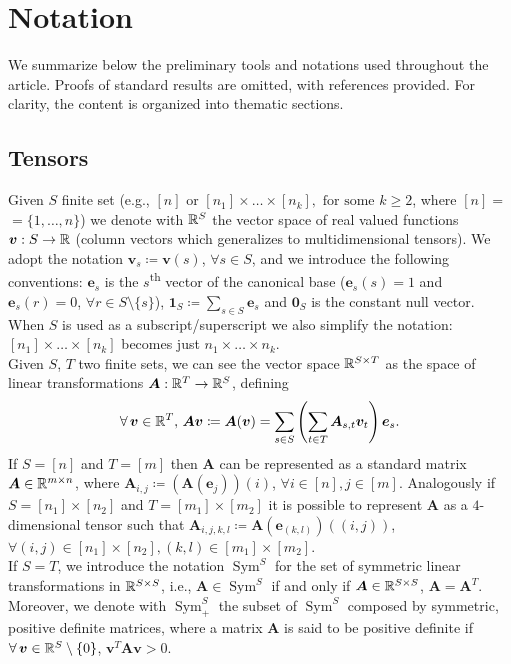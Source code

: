 \section{Notation} \label{sec:notation}

We summarize below the preliminary tools and notations used throughout the article. Proofs of standard results are omitted, with references provided. For clarity, the content is organized into thematic sections.

\subsection{Tensors} \label{subsec:tensors}

Given $S$ finite set (e.g., $[n] \text{ or } [n_1] \times \dots \times [n_k], \text{ for some } k \geq 2$, where $[n] =$ $= \{1, \dots, n\}$) we denote with $\mathbb{R}^S$ the vector space of real valued functions $\bm{v}: S \to \mathbb{R}$ (column vectors which generalizes to multidimensional tensors). 
We adopt the notation $\bm{v}_s \coloneqq \bm{v}(s)$, $\forall s \in S$, and we introduce the following conventions: $\bm{e}_s$ is the $s$\textsuperscript{th} vector of the canonical base ($\bm{e}_s(s) = 1$ and $\bm{e}_s(r) = 0$, $\forall r \in S \setminus \{s\}$), $\bm{1}_{S} \coloneqq \sum_{s \in S} \bm{e}_s$ and $\bm{0}_{S}$ is the constant null vector. 
When $S$ is used as a subscript/superscript we also simplify the notation: $[n_1] \times \dots \times [n_k]$ becomes just $n_1 \times \dots \times n_k$. \\
Given $S$, $T$ two finite sets, we can see the vector space $\mathbb{R}^{S \times T}$ as the space of linear transformations $\bm{A}: \mathbb{R}^T \to \mathbb{R}^S$, defining 
\begin{equation*}
	\forall \bm{v} \in \real^T, \, \bm{A} \bm{v} \coloneqq \bm{A}(\bm{v}) = \sum_{s \in S} \left(\sum_{t \in T} \bm{A}_{s, t} \bm{v}_t\right) \bm{e}_s.
\end{equation*}
If $S = [n]$ and $T = [m]$ then $\bm{A}$ can be represented as a standard matrix $\bm{A} \in \mathbb{R}^{m \times n}$, where $\bm{A}_{i, j} \coloneqq (\bm{A}(\bm{e}_j))(i)$, $\forall i \in [n], j \in [m]$. 
Analogously if $S = [n_1] \times [n_2]$ and $T = [m_1] \times [m_2]$ it is possible to represent $\bm{A}$ as a $4$-dimensional tensor such that $\bm{A}_{i, j, k, l} \coloneqq \bm{A}(\bm{e}_{(k, l)})((i, j))$, $\forall (i, j) \in [n_1] \times [n_2], (k, l) \in [m_1] \times [m_2]$. \\
If $S = T$, we introduce the notation $\operatorname{Sym}^{S}$ for the set of symmetric linear transformations in $\mathbb{R}^{S \times S}$, i.e., $\bm{A} \in \operatorname{Sym}^{S}$ if and only if $\bm{A} \in \mathbb{R}^{S \times S}$, $\bm{A} = \bm{A}^T$. 
Moreover, we denote with $\operatorname{Sym}_+^{S}$ the subset of $\operatorname{Sym}^{S}$ composed by symmetric, positive definite matrices, where a matrix $\bm{A}$ is said to be positive definite if $\forall \bm{v} \in \real^S \setminus \{0\}$, $\bm{v}^T \bm{A} \bm{v} > 0$.

